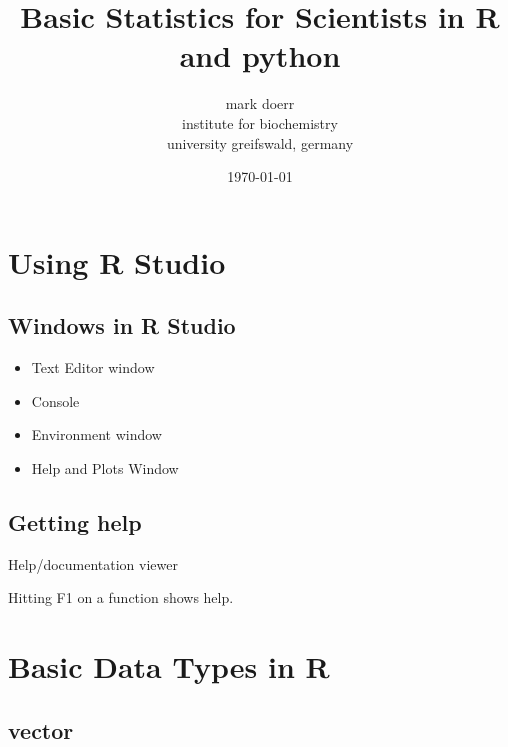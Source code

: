 \documentclass[a4paper,10pt]{book}\usepackage[]{graphicx}\usepackage[]{color}
\title{Basic Statistics for Scientists in R and python}
\date{\today}
\author{mark doerr \\ institute for biochemistry \\ university greifswald, germany}
\begin{document}
\maketitle
{}

\section{Using R Studio}

\subsection{Windows in R Studio}

\begin{itemize}
 \item Text Editor window 
 \item Console
 \item Environment window
 \item Help and Plots Window
\end{itemize}

\subsection{Getting help}

Help/documentation viewer

Hitting F1 on a function shows help.

\section{Basic Data Types in R}

\subsection{vector}
\end{document}
